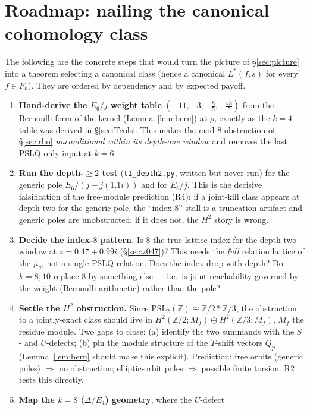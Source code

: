 \documentclass[11pt]{article}
\theoremstyle{definition}
\theoremstyle{remark}
\newcommand{\ZZ}{\mathbb{Z}}
\begin{document}
\section{Roadmap: nailing the canonical cohomology class}\label{sec:roadmap}

The following are the concrete steps that would turn the picture of \S\ref{sec:picture}
into a theorem selecting a canonical class (hence a canonical $L^*(f,s)$ for every
$f\in F_k$). They are ordered by dependency and by expected payoff.

\begin{enumerate}
\item[\textbf{R1.}] \textbf{Hand-derive the $E_6/j$ weight table} $(-11,-3,-\tfrac85,-\tfrac{48}5)$
from the Bernoulli form of the kernel (Lemma~\ref{lem:bern}) at $\rho$, exactly as the
$k=4$ table was derived in \S\ref{sec:Tcols}. This makes the mod-$8$ obstruction of
\S\ref{sec:rho} \emph{unconditional within its depth-one window} and removes the last
PSLQ-only input at $k=6$.
\item[\textbf{R2.}] \textbf{Run the depth-$\ge2$ test} (\texttt{t1\_depth2.py}, written but
never run) for the generic pole $E_6/(j-j(1.1i))$ and for $E_6/j$. This is the decisive
falsification of the free-module prediction (R4): if a joint-kill class appears at
depth two for the generic pole, the ``index-$8$'' stall is a truncation artifact and
generic poles are unobstructed; if it does not, the $H^2$ story is wrong.
\item[\textbf{R3.}] \textbf{Decide the index-$8$ pattern.} Is $8$ the true lattice index
for the depth-two window at $z=0.47+0.99i$ (\S\ref{sec:z047})? This needs the \emph{full}
relation lattice of the $\mu_g$, not a single PSLQ relation. Does the index drop with
depth? Do $k=8,10$ replace $8$ by something else --- i.e.\ is joint reachability governed
by the weight (Bernoulli arithmetic) rather than the pole?
\item[\textbf{R4.}] \textbf{Settle the $H^2$ obstruction.} Since
$\mathrm{PSL}_2(\ZZ)\cong\ZZ/2*\ZZ/3$, the obstruction to a jointly-exact class should
live in $H^2(\ZZ/2;M_f)\oplus H^2(\ZZ/3;M_f)$, $M_f$ the residue module. Two gaps to
close: (a) identify the two summands with the $S$- and $U$-defects; (b) pin the module
structure of the $T$-shift vectors $Q_p$ (Lemma~\ref{lem:bern} should make this explicit).
Prediction: free orbits (generic poles) $\Rightarrow$ no obstruction; elliptic-orbit
poles $\Rightarrow$ possible finite torsion. R2 tests this directly.
\item[\textbf{R5.}] \textbf{Map the $k=8$ ($\Delta/E_4$) geometry}, where the $U$-defect

\end{enumerate}
\end{document}
